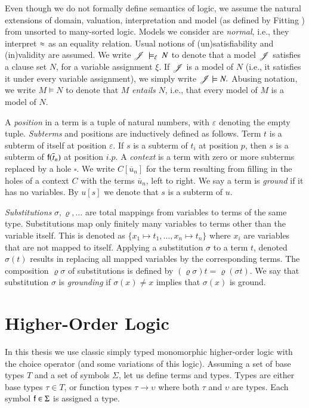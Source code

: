 Even though we do not formally define semantics of logic, we assume the natural
extensions of domain, valuation, interpretation and model (as defined by Fitting
\cite{mf-1996-fol}) from unsorted to many-sorted logic. Models we consider are
\emph{normal}, i.e., they interpret $\approx$ as an equality relation. Usual notions
of (un)satisfiability and (in)validity are assumed. We write
$\mathscr{J}~\models_\xi~N$ to denote that a model $\mathscr{J}$ satisfies a clause
set $N$, for a variable assignment $\xi$. If $\mathscr{J}$ is a model of $N$
(i.e., it satisfies it under every variable assignment), we simply write
$\mathscr{J} \models N.$  Abusing notation, we write $M \models N$ to denote that
$M$ \emph{entails} $N$, i.e., that every model of $M$ is a model of $N.$

A {\em position} in a term is a tuple of natural numbers, with $\varepsilon$ denoting
the empty tuple. {\em Subterms} and positions are inductively defined as follows. Term
$t$ is a subterm of itself at position $\varepsilon$. If $s$ is a subterm of
$t_i$ at position $p$, then $s$ is a subterm of $\mathsf{f}(\overline{t}_{n})$ at
position $i.p$. A {\em context} is a term with zero or more subterms replaced by a
hole $\square$. We write $C[\overline{u}_n]$ for the term resulting from filling
in the holes of a context $C$ with the terms $\overline{u}_n$, left to right.
We say a term is {\em ground} if it has no variables. By $u[s]$
we denote that $s$ is a subterm of $u$. 

{\em Substitutions} $\sigma, \varrho, \ldots$ are total mappings from variables to
terms of the same type. Substitutions map only finitely many variables to terms
other than the variable itself. This is denoted as $\{ x_1 \mapsto t_1, \ldots,
x_n \mapsto t_n \}$ where $x_i$ are variables that are not mapped to itself.
Applying a substitution $\sigma$ to a term $t$, denoted $\sigma(t)$ results in
replacing all mapped variables by the corresponding terms.
The composition $\varrho\sigma$ of substitutions is defined by
$\left(\varrho\sigma\right)t=\varrho\left(\sigma t\right)$. We say that substitution $\sigma$ is {\em grounding}
if $\sigma(x) \not= x$ implies that $\sigma(x)$ is ground.

\section{Higher-Order Logic}
\label{sec:pre:hol}

In this thesis we use classic simply typed monomorphic higher-order logic with
the choice operator (and some variations of this logic). Assuming a set of
base types $T$ and a set of symbols $\Sigma$, let us
define terms and types. Types are either base types $\tau \in T$, or function
types $\tau \rightarrow \upsilon$ where both $\tau$ and $\upsilon$ are types.
Each symbol $\mathsf{f} \in \Sigma$ is assigned a type.

